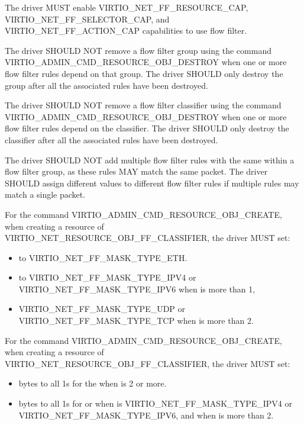 
The driver MUST enable VIRTIO_NET_FF_RESOURCE_CAP, VIRTIO_NET_FF_SELECTOR_CAP,
and VIRTIO_NET_FF_ACTION_CAP capabilities to use flow filter.

The driver SHOULD NOT remove a flow filter group using the command
VIRTIO_ADMIN_CMD_RESOURCE_OBJ_DESTROY when one or more flow filter rules
depend on that group. The driver SHOULD only destroy the group after
all the associated rules have been destroyed.

The driver SHOULD NOT remove a flow filter classifier using the command
VIRTIO_ADMIN_CMD_RESOURCE_OBJ_DESTROY when one or more flow filter rules
depend on the classifier. The driver SHOULD only destroy the classifier
after all the associated rules have been destroyed.

The driver SHOULD NOT add multiple flow filter rules with the same
 within a flow filter group, as these rules MAY match
the same packet. The driver SHOULD assign different 
values to different flow filter rules if multiple rules may match a single
packet.

For the command VIRTIO_ADMIN_CMD_RESOURCE_OBJ_CREATE, when creating a resource
of  VIRTIO_NET_RESOURCE_OBJ_FF_CLASSIFIER, the driver MUST set:
\begin{itemize}
\item {} to VIRTIO_NET_FF_MASK_TYPE_ETH.
\item {} to VIRTIO_NET_FF_MASK_TYPE_IPV4 or
      VIRTIO_NET_FF_MASK_TYPE_IPV6 when  is more than 1,
\item {} VIRTIO_NET_FF_MASK_TYPE_UDP or
      VIRTIO_NET_FF_MASK_TYPE_TCP when  is more than 2.
\end{itemize}

For the command VIRTIO_ADMIN_CMD_RESOURCE_OBJ_CREATE, when creating a resource
of  VIRTIO_NET_RESOURCE_OBJ_FF_CLASSIFIER, the driver MUST set:
\begin{itemize}
\item {} bytes to all 1s for the 
       when  is 2 or more.
\item {} bytes to all 1s for  or 
       when  is VIRTIO_NET_FF_MASK_TYPE_IPV4 or VIRTIO_NET_FF_MASK_TYPE_IPV6,
       and when  is more than 2.
\end{itemize}

